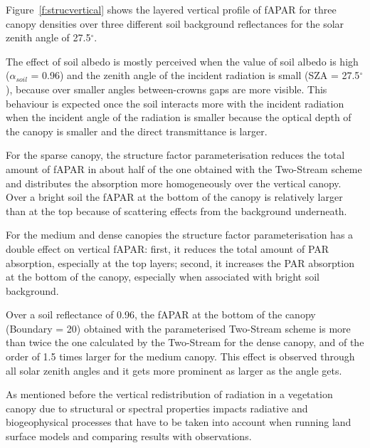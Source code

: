 \documentclass[a4paper,11pt]{report}
\begin{document}
Figure~\ref{f:strucvertical} shows the layered vertical profile of fAPAR for three canopy densities over three different soil background reflectances for the solar zenith angle of 27.5$^{\circ}$.

The effect of soil albedo is mostly perceived when the value of soil albedo is high ($\alpha_{soil}$ = 0.96) and the zenith angle of the incident radiation is small (SZA = 27.5$^{\circ}$), because over smaller angles between-crowns gaps are more visible. This behaviour is expected once the soil interacts more with the incident radiation when the incident angle of the radiation is smaller because the optical depth of the canopy is smaller and the direct transmittance is larger.

For the sparse canopy, the structure factor parameterisation reduces the total amount of fAPAR in about half of the one obtained with the Two-Stream scheme and distributes the absorption more homogeneously over the vertical canopy. Over a bright soil the fAPAR at the bottom of the canopy is relatively larger than at the top because of scattering effects from the background underneath.

For the medium and dense canopies the structure factor parameterisation has a double effect on vertical fAPAR: first, it reduces the total amount of PAR absorption, especially at the top layers; second, it increases the PAR absorption at the bottom of the canopy, especially when associated with bright soil background.

Over a soil reflectance of 0.96, the fAPAR at the bottom of the canopy (Boundary = 20) obtained with the parameterised Two-Stream scheme is more than twice the one calculated by the Two-Stream for the dense canopy, and of the order of 1.5 times larger for the medium canopy. This effect is observed through all solar zenith angles and it gets more prominent as larger as the angle gets. 

As mentioned before the vertical redistribution of radiation in a vegetation canopy due to structural or spectral properties impacts radiative and biogeophysical processes that have to be taken into account when running land surface models and comparing results with observations.
\end{document}
